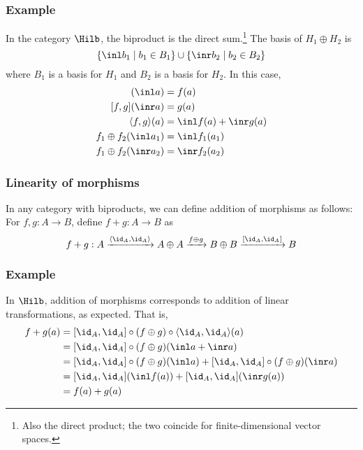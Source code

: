 \subsubsection*{Example} In the category $\Hilb$, the 
biproduct is the direct sum.\footnote{Also the direct product; the two coincide
for finite-dimensional vector spaces.} The basis of $H_1 \oplus H_2$ is 
\[ \{\inl b_1 \mid b_1 \in B_1 \} \cup \{\inr b_2 \mid b_2 \in B_2 \} \]
where $B_1$ is a basis for $H_1$ and $B_2$ is a basis for $H_2$. In this case,
\begin{align*}
    [f,g](\inl a) &= f(a) \\
    [f,g](\inr a) &= g(a) \\
    \langle f,g \rangle (a) &= \inl f(a) + \inr g(a) \\
    f_1 \oplus f_2(\inl a_1) &= \inl f_1(a_1) \\
    f_1 \oplus f_2(\inr a_2) &= \inr f_2(a_2)
\end{align*}

\subsubsection*{Linearity of morphisms}

In any category with biproducts, we can define addition of morphisms as follows:
For $f, g : A \rightarrow B$, define $f + g : A \rightarrow B$ as
    \[ f + g : A
    \xrightarrow{\langle \id_A, \id_A \rangle}
    A \oplus A
    \xrightarrow{f \oplus g}
    B \oplus B  
    \xrightarrow{[\id_A,\id_A]}
    B
    \]
 \subsubsection*{Example} In $\Hilb$, addition of morphisms corresponds to addition of linear
transformations, as expected. That is,
\begin{align*}
    f+g(a)
    &= [\id_A,\id_A] \circ (f \oplus g) \circ \langle \id_A, \id_A \rangle (a) \\
    &= [\id_A,\id_A] \circ (f \oplus g) (\inl a + \inr a) \\
    &= [\id_A,\id_A] \circ (f \oplus g) (\inl a)
     + [\id_A,\id_A] \circ (f \oplus g) (\inr a) \\
    &= [\id_A,\id_A] (\inl f(a)) + [\id_A,\id_A] (\inr g(a)) \\
    &= f(a) + g(a)
\end{align*}

